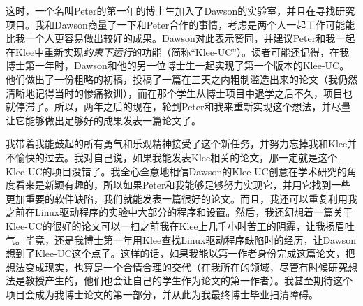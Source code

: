\documentclass[letter,12pt]{book}
\begin{document}
\begin{CJK}{UTF8}{gbsn}
这时，一个名叫Peter的第一年的博士生加入了Dawson的实验室，并且在寻找研究项目。我和Dawson商量了一下和Peter合作的事情，考虑是两个人一起工作可能能比我一个人更容易做出较好的成果。Dawson对此表示赞同，并建议Peter和我一起在Klee中重新实现\emph{约束下运行}的功能（简称“Klee-UC”）。读者可能还记得，在我博士第一年时，Dawson和他的另一位博士生一起实现了第一个版本的Klee-UC。他们做出了一份粗略的初稿，投稿了一篇在三天之内粗制滥造出来的论文（我仍然清晰地记得当时的惨痛教训），而在那个学生从博士项目中退学之后不久，项目也就停滞了。所以，两年之后的现在，轮到Peter和我来重新实现这个想法，并尽量让它能够做出足够好的成果发表一篇论文了。

我带着我能鼓起的所有勇气和乐观精神接受了这个新任务，并努力忘掉我和Klee并不愉快的过去。我对自己说，如果我能发表Klee相关的论文，那一定就是这个Klee-UC的项目没错了。我全心全意地相信Dawson的Klee-UC创意在学术研究的角度看来是新颖有趣的，所以如果Peter和我能够足够努力实现它，并用它找到一些更加重要的软件缺陷，我们就能发表一篇很好的论文。而且，我还可以重复利用我之前在Linux驱动程序的实验中大部分的程序和设置。然后，我还幻想着一篇关于Klee-UC的很好的论文可以一扫之前我在Klee上几千小时苦工的阴霾，让我扬眉吐气。毕竟，还是我博士第一年用Klee查找Linux驱动程序缺陷时的经历，让Dawson想到了Klee-UC这个点子。这样的话，如果我能以第一作者身份完成这篇论文，把想法变成现实，也算是一个合情合理的交代（在我所在的领域，尽管有时候研究想法是教授产生的，他们也会让自己的学生作为论文的第一作者）。我甚至期待这个项目会成为我博士论文的第一部分，并从此为我最终博士毕业扫清障碍。






\clearpage
\clearpage

\end{CJK}
\end{document}
